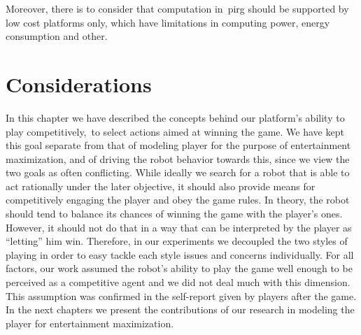 Moreover, there is to consider that computation in~\gls{pirg} should be supported by low cost platforms only, which have limitations in computing power, energy consumption and other.

\section{Considerations}
In this chapter we have described the concepts behind our platform's ability to play competitively,~\ie to select actions aimed at winning the game. We have kept this goal separate from that of modeling player for the purpose of entertainment maximization, and of driving the robot behavior towards this, since we view the two goals as often conflicting. While ideally we search for a robot that is able to act rationally under the later objective, it should also provide means for competitively engaging the player and obey the game rules. In theory, the robot should tend to balance its chances of winning the game with the player's ones. However, it should not do that in a way that can be interpreted by the player as ``letting'' him win. Therefore, in our experiments we decoupled the two styles of playing in order to easy tackle each style issues and concerns individually. For all factors, our work assumed the robot's ability to play the game well enough to be perceived as a competitive agent and we did not deal much with this dimension. This assumption was confirmed in the self-report given by players after the game. In the next chapters we present the contributions of our research in modeling the player for entertainment maximization.